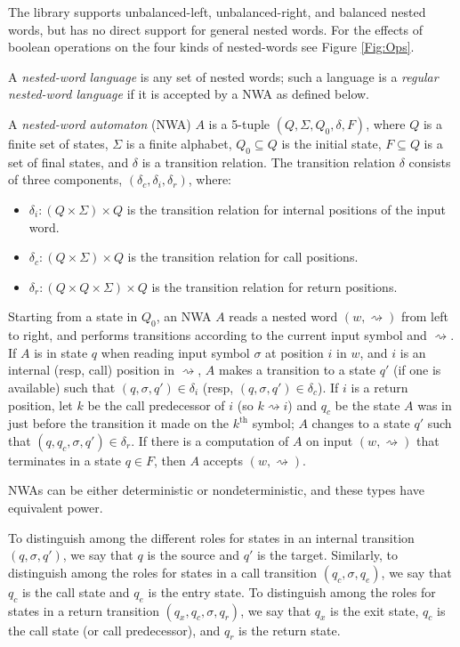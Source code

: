 The library supports unbalanced-left, unbalanced-right, and balanced
nested words, but has no direct support for general nested words.  For the
effects of boolean operations on the four kinds of nested-words see Figure
\ref{Fig:Ops}.


\begin{definition}
  \label{De:NWA}

  A \textsl{nested-word language} is any set of nested words; such a language
  is a \textsl{regular nested-word language} if it is accepted by a NWA as
  defined below.


  A \textsl{nested-word automaton} (NWA) $A$ is a 5-tuple $(Q, \Sigma, Q_0,
  \delta, F)$, where $Q$ is a finite set of states, $\Sigma$ is a finite
  alphabet, $Q_0 \subseteq Q$ is the initial state, $F \subseteq Q$ is a set of
  final states, and $\delta$ is a transition relation. The transition
  relation $\delta$ consists of three components, $(\delta_c, \delta_i,
  \delta_r)$, where:
  \begin{itemize}
    \item
      $\delta_i: (Q \times \Sigma) \times Q$ is the transition relation for
      internal positions of the input word.
    \item
      $\delta_c: (Q \times \Sigma) \times Q$ is the transition relation for
      call positions.
    \item
      $\delta_r: (Q \times Q \times \Sigma) \times Q$ is the transition
      relation for return positions.
  \end{itemize}

  Starting from a state in $Q_0$, an NWA $A$ reads a nested word $(w,\rightsquigarrow)$
  from left to right, and performs transitions according to the current input
  symbol and $\rightsquigarrow$.  If $A$ is in state $q$ when reading input
  symbol $\sigma$ at position $i$ in $w$, and $i$ is an internal (resp, call)
  position in $\rightsquigarrow$, $A$ makes a transition to a state $q'$ (if
  one is available) such that $(q,\sigma,q')\in\delta_i$ (resp,
  $(q,\sigma,q')\in\delta_c$).  If $i$ is a return position, let $k$ be the
  call predecessor of $i$ (so $k \rightsquigarrow i$) and $q_c$ be the state
  $A$ was in just before the transition it made on the $k^{\textrm{th}}$
  symbol; $A$ changes to a state $q'$ such that $(q,q_c,\sigma,q')
  \in\delta_r$. If there is a computation of $A$ on input
  $(w,\rightsquigarrow)$ that terminates in a state $q\in F$, then $A$
  accepts $(w,\rightsquigarrow)$.

  NWAs can be either deterministic or nondeterministic, and these types have
  equivalent power.
\end{definition}


To distinguish among the different roles for states in an internal
transition $(q,\sigma,q')$, we say that $q$ is the source and $q'$ is the
target.  Similarly, to distinguish among the roles for states in a call
transition $(q_c,\sigma,q_e)$, we say that $q_c$ is the call state and $q_e$
is the entry state. To distinguish among the roles for states in a return
transition $(q_x,q_c,\sigma,q_r)$, we say that $q_x$ is the exit state,
$q_c$ is the call state (or call predecessor), and $q_r$ is the return state.
